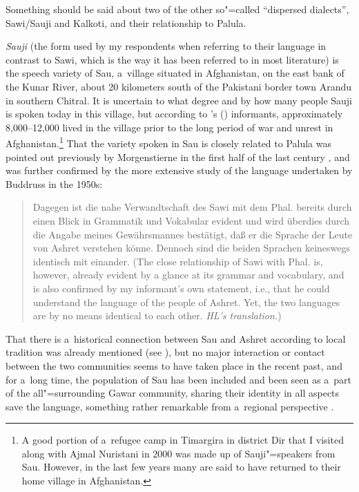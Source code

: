 \largerpage 
Something should be said about two of the other so"=called ``dispersed dialects'', Sawi/Sauji and Kalkoti, and their relationship to Palula. 


\textit{Sauji} (the form used by my respondents when referring to their language in contrast to
Sawi, which is the way it has been referred to in most literature) is the speech variety of Sau,
a~village situated in Afghanistan, on the east bank of the Kunar River, about 20 kilometers south of
the Pakistani border town Arandu in southern Chitral. It is uncertain to what degree and by how many
people Sauji is spoken today in this village, but according to \citeauthor{decker1992a}'s
(\citeyear{decker1992a}) informants, approximately 8,000--12,000 lived in the village prior to the
long period of war and unrest in Afghanistan.\footnote{A good portion of a~refugee camp in Timargira
  in district Dir that I visited along with Ajmal Nuristani in 2000 was made up of Sauji"=speakers
  from Sau. However, in the last few years many are said to have returned to their home village in
  Afghanistan.} That the variety spoken in Sau is closely related to Palula was pointed out
previously by Morgenstierne in the first half of the last century \citep[7]{morgenstierne1941}, and
was further confirmed by the more extensive study of the language undertaken by Buddruss in the
1950s:

\begin{quote}
Dagegen ist die nahe Verwandtschaft des Sawi mit dem Phal. bereits durch einen Blick in Grammatik und Vokabular evident und wird überdies durch die Angabe meines Gewährsmannes bestätigt, daß er die Sprache der Leute von Ashret verstehen könne. Dennoch sind die beiden Sprachen keineswegs identisch mit einander. (The close relationship of Sawi with Phal. is, however, already evident by a glance at its grammar and vocabulary, and is also confirmed by my informant's own statement, i.e., that he could understand the language of the people of Ashret. Yet, the two languages are by no means identical to each other. \textit{HL's translation.}) \citep[11]{buddruss1967}
\end{quote}


That there is a~historical connection between Sau and Ashret according to local tradition was
already mentioned (see ), but no major interaction or
contact between the two communities seems to have taken place in the recent past, and for a~long
time, the population of Sau has been included and been seen as a~part of the all"=surrounding Gawar
community, sharing their identity in all aspects save the language, something rather remarkable from
a~regional perspective \citep[232]{cacopardo2001}.
 

